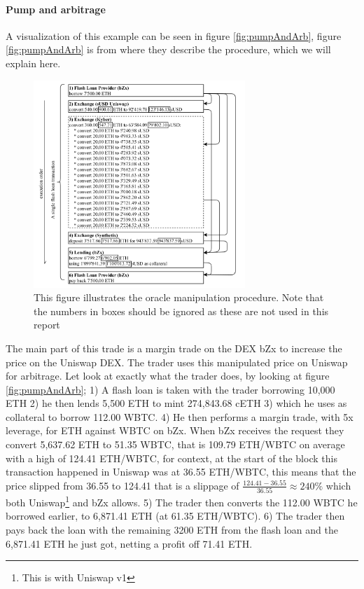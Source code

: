 \paragraph{Pump and arbitrage} A visualization of this example can be
seen in figure \ref{fig:pumpAndArb}, figure \ref{fig:pumpAndArb} is
from \cite{attack} where they describe the procedure, which we will
explain here.
\begin{figure}
  \centering
  \includegraphics[width=8cm]{assests/oracle}
  \caption{This figure illustrates the oracle manipulation
    procedure. Note that the numbers in boxes should be ignored as
    these are not used in this report \cite[p. 6 fig. 7]{attack}}
  \label{fig:oracle}
\end{figure}
The main part of this trade is a margin trade on the DEX bZx to
increase the price on the Uniswap DEX. The trader uses this
manipulated price on Uniswap for arbitrage. Let look at exactly what
the trader does, by looking at figure \ref{fig:pumpAndArb}; 1) A flash
loan is taken with the trader borrowing 10,000 ETH 2) he then lends
5,500 ETH to mint 274,843.68 cETH 3) which he uses as collateral to
borrow 112.00 WBTC. 4) He then performs a margin trade, with 5x
leverage, for ETH against WBTC on bZx. When bZx receives the request
they convert 5,637.62 ETH to 51.35 WBTC, that is 109.79 ETH/WBTC on
average with a high of 124.41 ETH/WBTC, for context, at the start of
the block this transaction happened in Uniswap was at 36.55 ETH/WBTC,
this means that the price slipped from 36.55 to 124.41 that is a
slippage of $\frac{124.41-36.55}{36.55}\approx 240\%$ which both
Uniswap\footnote{This is with Uniswap v1} and bZx allows. 5) The
trader then converts the 112.00 WBTC he borrowed earlier, to 6,871.41
ETH (at 61.35 ETH/WBTC). 6) The trader then pays back the loan with
the remaining 3200 ETH from the flash loan and the 6,871.41 ETH he
just got, netting a profit off 71.41 ETH.

